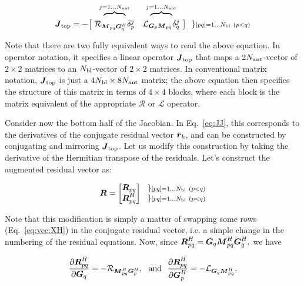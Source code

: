 \documentclass[useAMS,usenatbib]{mn2e}
\newcommand{\mat}[1]{{\bmath{#1}}}
\newcommand{\JJ}{\mat{J}} %
\newcommand{\MM}{\mat{M}}
\newcommand{\RR}{\mat{R}}
\newcommand{\GG}{\mat{G}}
\begin{document}
\begin{equation}
\label{eq:JJtop}
\begin{array}{r@{~}cc@{~}cc}
  & \overbrace{~~~~~~~~}^{j=1\dots \Na} & \overbrace{~~~~~~~~}^{j=1\dots \Na} \\

\JJ_\mathrm{top} = - \big [ & 
\Rop{ \MM_{pq}\GG^H_q }\delta^j_p & 
\Lop{ \GG_p \MM_{pq}  }\delta^j_q 
& \big ] ~~ \} \scriptstyle [pq]=1\dots \Nbl~(p<q)
% 
\end{array}
\end{equation}

Note that there are two fully equivalent ways to read the above equation. In operator notation, it specifies a linear operator $\JJ_\mathrm{top}$
that maps a $2N_\mathrm{ant}$-vector of $2\times2$ matrices to an $N_\mathrm{bl}$-vector of $2\times2$ matrices. In conventional matrix notation, 
$\JJ_\mathrm{top}$ is just a $4N_\mathrm{bl}\times8N_\mathrm{ant}$ matrix; the above equation then specifies the structure of this matrix in terms
of $4\times4$ blocks, where each block is the matrix equivalent of the appropriate $\mathcal{R}$ or $\mathcal{L}$ operator.

Consider now the bottom half of the Jacobian. In Eq.~\ref{eq:JJ}, this corresponds to the derivatives of the conjugate residual
vector $\bar{\bmath{r}}_k$, and can be constructed by conjugating and mirroring $\JJ_\mathrm{top}$. Let us modify this construction 
by taking the derivative of the Hermitian transpose of the residuals. Let's construct the augmented residual vector 
as:

\begin{equation}
\bmath{R} = 
\Matrix{c}{
  \RR_{pq} \\ 
  \RR^H_{pq} 
} 
~~ 
\Stack{ 
\} \scriptstyle [pq]=1\dots \Nbl~(p<q) \\ 
\} \scriptstyle [pq]=1\dots \Nbl~(p<q) 
}
\label{eq:RRtranspose}
\end{equation}

Note that this modification is simply a matter of swapping some rows (Eq.~\ref{eq:vec:XH}) in the conjugate residual vector,
i.e. a simple change in the numbering of the residual equations. Now, since $\RR^H_{pq}=\GG_q \MM^H_{pq} \GG^H_q,$ we have

\begin{equation}
\label{eq:dRH:dG}
\frac{\partial\RR^H_{pq}}{\partial\GG_q} = -\Rop{\MM^H_{pq}\GG^H_p},\mathrm{~~and~~}
\frac{\partial\RR^H_{pq}}{\partial\GG^H_p} = -\Lop{\GG_q \MM^H_{pq}},
\end{equation}
\end{document}
